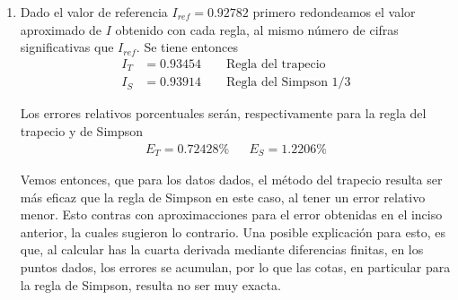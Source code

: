 \begin{problema}
\begin{enumerate}[label=\textbf{\alph*)}]
Hemos resaltado en naranja la segunda y cuarta derivada de valor absoluto más grande. Notemos que en este caso $b=1,\ a=0$ y $n=4$. Entonces 

\begin{align*}
    |E_T|&\approx\frac{5.4768}{12\times 4^2} & |E_S| &\approx \frac{67.4816}{180\times 4^4}\\[1em]
     &\approx 0.028525 & &\approx 0.00146444
\end{align*}

\item Dado el valor  de referencia $I_{ref}=0.92782$ primero redondeamos el valor aproximado de $I$ obtenido con cada regla, al mismo número de cifras significativas que $I_{ref}$. Se tiene entonces
\begin{align*}
    I_T&=0.93454 \qquad \text{Regla del trapecio}\\[1em]
    I_S&=0.93914\qquad \text{Regla del Simpson 1/3}
\end{align*}

Los errores relativos porcentuales serán, respectivamente para la regla del trapecio y de Simpson
\begin{align*}
    E_T=0.72428\% && E_S=1.2206\%
\end{align*}

Vemos entonces, que para los datos dados, el método del trapecio resulta ser más eficaz que la regla de Simpson en este caso, al tener un error relativo menor. Esto contras con aproximacciones para el error obtenidas en el inciso anterior, la cuales sugieron lo contrario. Una posible explicación para esto, es que, al calcular has la cuarta derivada mediante diferencias finitas, en los puntos dados, los errores se acumulan, por lo que las cotas, en particular para la regla de Simpson, resulta no ser muy exacta.

\end{enumerate}
\end{problema}